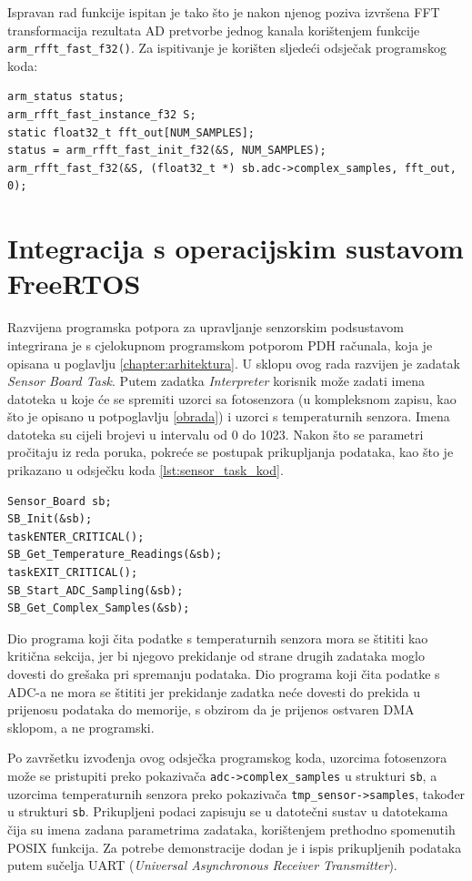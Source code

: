 Ispravan rad funkcije ispitan je tako što je nakon njenog poziva izvršena FFT transformacija rezultata AD pretvorbe jednog kanala korištenjem funkcije \texttt{arm\_rfft\_fast\_f32()}. Za ispitivanje je korišten sljedeći odsječak programskog koda:

\begin{lstlisting}[caption={Program za računanje FFT spektra signala}]
arm_status status;
arm_rfft_fast_instance_f32 S;
static float32_t fft_out[NUM_SAMPLES];
status = arm_rfft_fast_init_f32(&S, NUM_SAMPLES);
arm_rfft_fast_f32(&S, (float32_t *) sb.adc->complex_samples, fft_out, 0);
\end{lstlisting}

\section{Integracija s operacijskim sustavom FreeRTOS}

Razvijena programska potpora za upravljanje senzorskim podsustavom integrirana je s cjelokupnom programskom potporom PDH računala, koja je opisana u poglavlju \ref{chapter:arhitektura}. U sklopu ovog rada razvijen je zadatak \textit{Sensor Board Task}. Putem zadatka \textit{Interpreter} korisnik može zadati imena datoteka u koje će se spremiti uzorci sa fotosenzora (u kompleksnom zapisu, kao što je opisano u potpoglavlju \ref{obrada}) i uzorci s temperaturnih senzora. Imena datoteka su cijeli brojevi u intervalu od 0 do 1023. Nakon što se parametri pročitaju iz reda poruka, pokreće se postupak prikupljanja podataka, kao što je prikazano u odsječku koda \ref{lst:sensor_task_kod}.

\begin{lstlisting}[caption={Prikupljanje podataka u sklopu zadatka za upravljanje senzorskim podsustavom}, label={lst:sensor_task_kod}]
Sensor_Board sb;
SB_Init(&sb);
taskENTER_CRITICAL();
SB_Get_Temperature_Readings(&sb);
taskEXIT_CRITICAL();
SB_Start_ADC_Sampling(&sb);
SB_Get_Complex_Samples(&sb);
\end{lstlisting}

Dio programa koji čita podatke s temperaturnih senzora mora se štititi kao kritična sekcija, jer bi njegovo prekidanje od strane drugih zadataka moglo dovesti do grešaka pri spremanju podataka. Dio programa koji čita podatke s ADC-a ne mora se štititi jer prekidanje zadatka neće dovesti do prekida u prijenosu podataka do memorije, s obzirom da je prijenos ostvaren DMA sklopom, a ne programski.

Po završetku izvođenja ovog odsječka programskog koda, uzorcima fotosenzora može se pristupiti preko pokazivača \texttt{adc->complex\_samples} u strukturi \texttt{sb}, a uzorcima temperaturnih senzora preko pokazivača \texttt{tmp\_sensor->samples}, također u strukturi \texttt{sb}. Prikupljeni podaci zapisuju se u datotečni sustav u datotekama čija su imena zadana parametrima zadataka, korištenjem prethodno spomenutih POSIX funkcija. Za potrebe demonstracije dodan je i ispis prikupljenih podataka putem sučelja UART (\textit{Universal Asynchronous Receiver Transmitter}).

